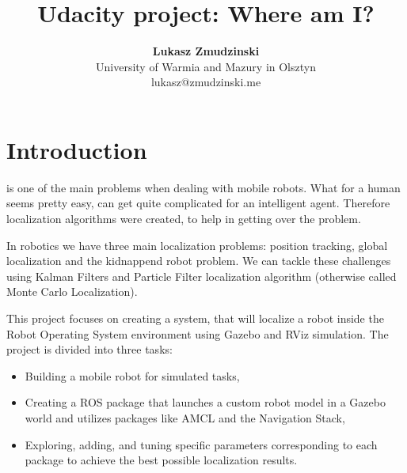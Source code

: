 \documentclass[10pt,journal,compsoc]{IEEEtran}
\begin{document}
    
    \title{Udacity project: Where am I?}
    
    \author{\textbf{Lukasz Zmudzinski} \\ University of Warmia and Mazury in Olsztyn \\ lukasz@zmudzinski.me}
    
    
    
    \maketitle
    \IEEEdisplaynontitleabstractindextext
    \IEEEpeerreviewmaketitle
    \section{Introduction}
    \label{sec:introduction}
    
     is one of the main problems when dealing with mobile robots. What for a human seems pretty easy, can get quite complicated for an intelligent agent. Therefore localization algorithms were created, to help in getting over the problem.

    In robotics we have three main localization problems: position tracking, global localization and the kidnappend robot problem. We can tackle these challenges using Kalman Filters and Particle Filter localization algorithm (otherwise called Monte Carlo Localization).

    This project focuses on creating a system, that will localize a robot inside the Robot Operating System environment using Gazebo and RViz simulation. The project is divided into three tasks:
    
    \begin{itemize}
        \item Building a mobile robot for simulated tasks,
        \item Creating a ROS package that launches a custom robot model in a Gazebo world and utilizes packages like AMCL and the Navigation Stack,
        \item Exploring, adding, and tuning specific parameters corresponding to each package to achieve the best possible localization results.
    \end{itemize}
\end{document}
